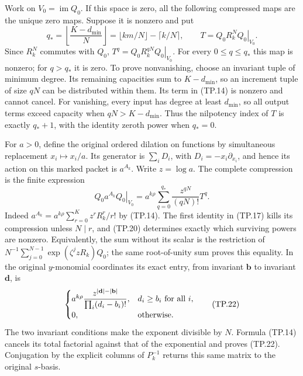 Work on \(V_0=\operatorname{im}Q_0\). If this space is zero,
all the following compressed maps are the unique zero maps.
Suppose it is nonzero and put
\[
 q_* =\left\lfloor\frac{K-d_{\min}}{N}\right\rfloor
       =\lfloor km/N\rfloor-\lceil k/N\rceil,\qquad
 T=\left.Q_0R_k^NQ_0\right|_{V_0}.
 \tag{TP.20}\label{CFStage:eq:tp-return}
\]
Since \(R_k^N\) commutes with \(Q_0\),
\(T^q=\left.Q_0R_k^{qN}Q_0\right|_{V_0}\).
For every \(0\leq q\leq q_*\) this map is nonzero; for
\(q>q_*\) it is zero. To prove nonvanishing, choose an
invariant tuple of minimum degree. Its remaining capacities
sum to \(K-d_{\min}\), so an increment tuple of size \(qN\)
can be distributed within them. Its term in (TP.14) is
nonzero and cannot cancel. For vanishing, every input has
degree at least \(d_{\min}\), so all output terms exceed
capacity when \(qN>K-d_{\min}\). Thus the nilpotency
index of \(T\) is exactly \(q_*+1\), with the identity
zeroth power when \(q_*=0\).

For \(a>0\), define the original ordered dilation on
functions by simultaneous replacement \(x_i\mapsto x_i/a\).
Its generator is \(\sum_iD_i\), with
\(D_i=-x_i\partial_{x_i}\), and hence its action on this
marked packet is \(a^{A_k}\). Write \(z=\log a\).
The complete compression is the finite expression
\[
 \left.Q_0a^{A_k}Q_0\right|_{V_0}
   =a^{k\rho}\sum_{q=0}^{q_*}
          \frac{z^{qN}}{(qN)!}T^q.
 \tag{TP.21}\label{CFStage:eq:tp-dilation}
\]
Indeed \(a^{A_k}=a^{k\rho}\sum_{r=0}^{K}z^rR_k^r/r!\)
by (TP.14). The first identity in (TP.17) kills its
compression unless \(N\mid r\), and (TP.20) determines
exactly which surviving powers are nonzero. Equivalently,
the sum without its scalar is the restriction of
\(N^{-1}\sum_{j=0}^{N-1}\exp(\zeta^jzR_k)Q_0\);
the same root-of-unity sum proves this equality.
In the original \(y\)-monomial coordinates its exact
entry, from invariant \(\mathbf b\) to invariant
\(\mathbf d\), is
\[
 \begin{cases}
 a^{k\rho}\displaystyle\frac{z^{|\mathbf d|-|\mathbf b|}}
                    {\prod_i(d_i-b_i)!},&d_i\geq b_i\ \hbox{for all }i,\\
 0,&\hbox{otherwise}.
 \end{cases}
 \tag{TP.22}\label{CFStage:eq:tp-entry}
\]
The two invariant conditions make the exponent divisible
by \(N\). Formula (TP.14) cancels its total factorial
against that of the exponential and proves (TP.22).
Conjugation by the explicit columns of \(P_k^{-1}\)
returns this same matrix to the original \(s\)-basis.


